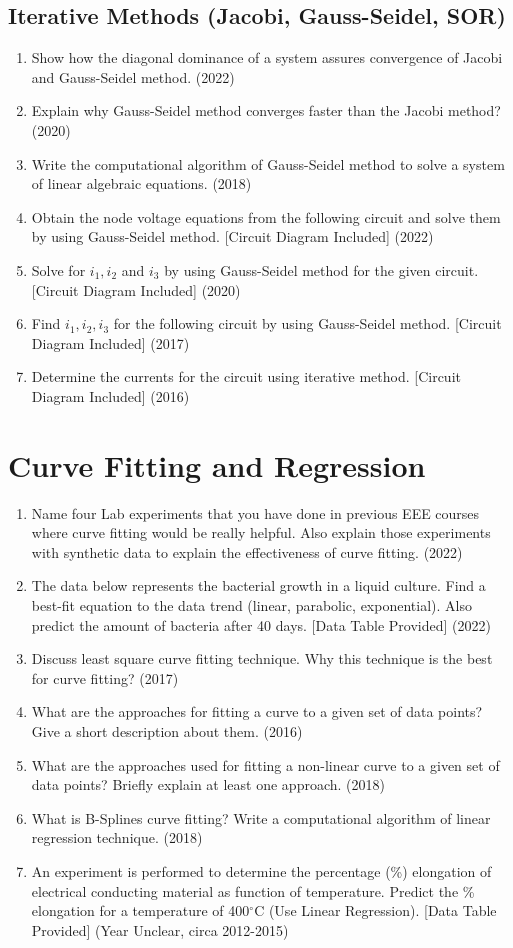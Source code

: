 \documentclass[12pt, a4paper]{article}
\begin{document}
	\subsection{Iterative Methods (Jacobi, Gauss-Seidel, SOR)}
	\begin{enumerate}
		\item Show how the diagonal dominance of a system assures convergence of Jacobi and Gauss-Seidel method. (2022)
		\item Explain why Gauss-Seidel method converges faster than the Jacobi method? (2020)
		\item Write the computational algorithm of Gauss-Seidel method to solve a system of linear algebraic equations. (2018)
		\item Obtain the node voltage equations from the following circuit and solve them by using Gauss-Seidel method. [Circuit Diagram Included] (2022)
		\item Solve for $i_1, i_2$ and $i_3$ by using Gauss-Seidel method for the given circuit. [Circuit Diagram Included] (2020)
		\item Find $i_1, i_2, i_3$ for the following circuit by using Gauss-Seidel method. [Circuit Diagram Included] (2017)
		\item Determine the currents for the circuit using iterative method. [Circuit Diagram Included] (2016)
	\end{enumerate}
	
	\section{Curve Fitting and Regression}
	\begin{enumerate}
		\item Name four Lab experiments that you have done in previous EEE courses where curve fitting would be really helpful. Also explain those experiments with synthetic data to explain the effectiveness of curve fitting. (2022)
		\item The data below represents the bacterial growth in a liquid culture. Find a best-fit equation to the data trend (linear, parabolic, exponential). Also predict the amount of bacteria after 40 days. [Data Table Provided] (2022)
		\item Discuss least square curve fitting technique. Why this technique is the best for curve fitting? (2017)
		\item What are the approaches for fitting a curve to a given set of data points? Give a short description about them. (2016)
		\item What are the approaches used for fitting a non-linear curve to a given set of data points? Briefly explain at least one approach. (2018)
		\item What is B-Splines curve fitting? Write a computational algorithm of linear regression technique. (2018)
		\item An experiment is performed to determine the percentage (\%) elongation of electrical conducting material as function of temperature. Predict the \% elongation for a temperature of 400$^\circ$C (Use Linear Regression). [Data Table Provided] (Year Unclear, circa 2012-2015)
	\end{enumerate}
	
\end{document}
